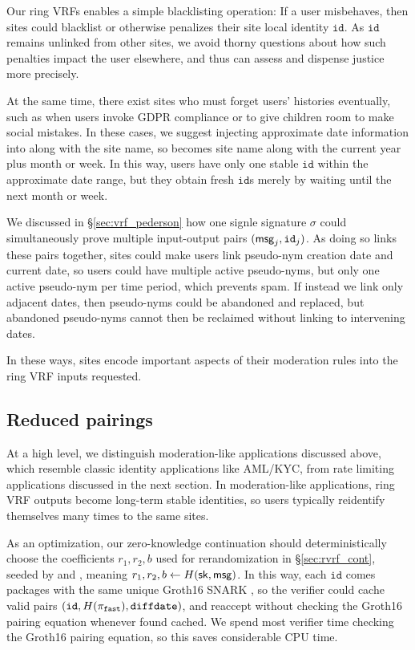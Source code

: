 Our ring VRFs enables a simple blacklisting operation:
If a user misbehaves, then sites could blacklist or otherwise penalizes
their site local identity $\mathtt{id}$.
As $\mathtt{id}$ remains unlinked from other sites, we avoid thorny
questions about how such penalties impact the user elsewhere, and thus
can assess and dispense justice more precisely. 

At the same time, there exist sites who must forget users' histories
eventually, such as when users invoke GDPR compliance or to give children
room to make social mistakes.  In these cases, we suggest injecting
approximate date information into \msg along with the site name,
so \msg becomes site name along with the current year plus month or week.
In this way, users have only one stable $\mathtt{id}$ within the
approximate date range, but they obtain fresh $\mathtt{id}$s merely
by waiting until the next month or week.

We discussed in \S\ref{sec:vrf_pederson} how one signle \PedVRF
signature $\sigma$ could simultaneously prove multiple input-output
pairs $(\mathsf{msg}_j,\mathtt{id}_j)$.  As doing so links these pairs
together, sites could make users link pseudo-nym creation date and
current date, so users could have multiple active pseudo-nyms,
but only one active pseudo-nym per time period, which prevents spam.
If instead we link only adjacent dates, then pseudo-nyms could
be abandoned and replaced, but abandoned pseudo-nyms cannot then
be reclaimed without linking to intervening dates.

In these ways, sites encode important aspects of their moderation rules
into the ring VRF inputs requested.  


\subsection{Reduced pairings}
\label{sec:reduced_pairings}

At a high level, we distinguish moderation-like applications discussed
above, which resemble classic identity applications like AML/KYC, from
rate limiting applications discussed in the next section. 
%
In moderation-like applications, ring VRF outputs become long-term
stable identities, so users typically reidentify themselves many times
to the same sites.

As an optimization, our zero-knowledge continuation
should deterministically choose the coefficients $r_1,r_2,b$ used for
rerandomization in \S\ref{sec:rvrf_cont},
 seeded by \msg and \sk, meaning $r_1,r_2,b \leftarrow H(\mathsf{sk},\mathsf{msg})$. 
%
In this way, each $\mathtt{id}$ comes packages with the same unique
Groth16 SNARK \pifast, so the verifier could cache valid pairs
$(\mathtt{id},H(\pi_{\mathtt{fast}}),\mathtt{diffdate})$, and reaccept \pifast
without checking the Groth16 pairing equation whenever found cached.
%
We spend most verifier time checking the Groth16 pairing equation, so
this saves considerable CPU time. %

